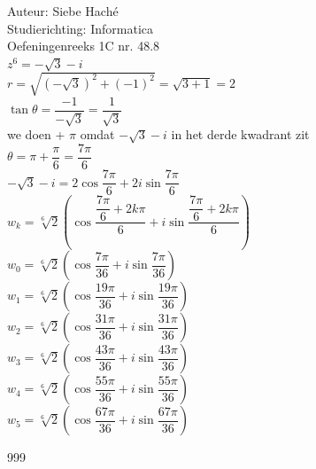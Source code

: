 \documentclass[a4paper]{article}
\begin{document}
  
\noindent \large Auteur: Siebe Haché \\
\noindent \large Studierichting: Informatica\\
\noindent \large Oefeningenreeks 1C nr. 48.8\\
\medskip
\normalsize
$z^6 = -\sqrt{3} - i$\\

$r = \sqrt{(-\sqrt{3})^2 + (-1)^2} = \sqrt{3 + 1} = 2$\\

$\tan\theta = \dfrac{-1}{-\sqrt{3}} = \dfrac{1}{\sqrt{3}}$\\

we doen + $\pi$ omdat $-\sqrt{3} - i$ in het derde kwadrant zit\\

$\theta = \pi + \dfrac{\pi}{6} = \dfrac{7\pi}{6}$\\

$-\sqrt{3} - i = 2\cos\dfrac{7\pi}{6} + 2i\sin\dfrac{7\pi}{6}$\\

$w_k = \sqrt[6]{2}\left(\cos\dfrac{\dfrac{7\pi}{6} + 2k\pi}{6} + i\sin\dfrac{\dfrac{7\pi}{6} + 2k\pi}{6}\right)$\\

$w_0 = \sqrt[6]{2}\left(\cos\dfrac{7\pi}{36} + i\sin\dfrac{7\pi}{36}\right)$\\

$w_1 = \sqrt[6]{2}\left(\cos\dfrac{19\pi}{36} + i\sin\dfrac{19\pi}{36}\right)$\\

$w_2 = \sqrt[6]{2}\left(\cos\dfrac{31\pi}{36} + i\sin\dfrac{31\pi}{36}\right)$\\

$w_3 = \sqrt[6]{2}\left(\cos\dfrac{43\pi}{36} + i\sin\dfrac{43\pi}{36}\right)$\\

$w_4 = \sqrt[6]{2}\left(\cos\dfrac{55\pi}{36} + i\sin\dfrac{55\pi}{36}\right)$\\

$w_5 = \sqrt[6]{2}\left(\cos\dfrac{67\pi}{36} + i\sin\dfrac{67\pi}{36}\right)$\\
\begin{thebibliography}{999}
\end{thebibliography}
\end{document}

